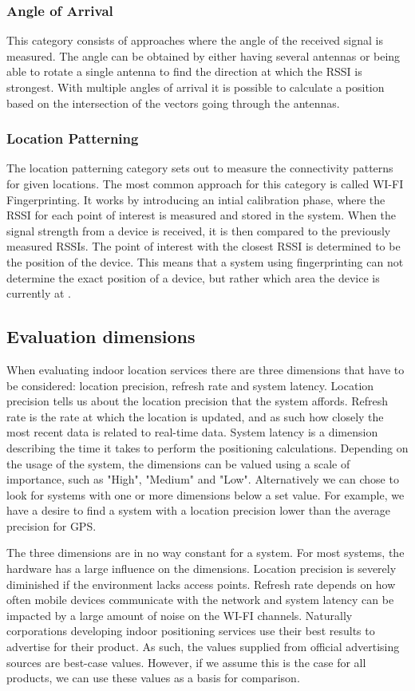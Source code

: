 \subsubsection*{Angle of Arrival}
This category consists of approaches where the angle of the received signal is measured. The angle can be obtained by either having several antennas or being able to rotate a single antenna to find the direction at which the RSSI is strongest. With multiple angles of arrival it is possible to calculate a position based on the intersection of the vectors going through the antennas.

\subsubsection*{Location Patterning}
The location patterning category sets out to measure the connectivity patterns for given locations. The most common approach for this category is called WI-FI Fingerprinting. It works by introducing an intial calibration phase, where the RSSI for each point of interest is measured and stored in the system. When the signal strength from a device is received, it is then compared to the previously measured RSSIs. The point of interest with the closest RSSI is determined to be the position of the device. This means that a system using fingerprinting can not determine the exact position of a device, but rather which area the device is currently at \cite{fingerprint1}.

\subsection{Evaluation dimensions}
When evaluating indoor location services there are three dimensions that have to be considered: location precision, refresh rate and system latency. Location precision tells us about the location precision that the system affords. Refresh rate is the rate at which the location is updated, and as such how closely the most recent data is related to real-time data. System latency is a dimension describing the time it takes to perform the positioning calculations\cite{dimensions}. Depending on the usage of the system, the dimensions can be valued using a scale of importance, such as "High", "Medium" and "Low". Alternatively we can chose to look for systems with one or more dimensions below a set value. For example, we have a desire to find a system with a location precision lower than the average precision for GPS. 

The three dimensions are in no way constant for a system. For most systems, the hardware has a large influence on the dimensions. Location precision is severely diminished if the environment lacks access points. Refresh rate depends on how often mobile devices communicate with the network and system latency can be impacted by a large amount of noise on the WI-FI channels. Naturally corporations developing indoor positioning services use their best results to advertise for their product. As such, the values supplied from official advertising sources are best-case values. However, if we assume this is the case for all products, we can use these values as a basis for comparison.

